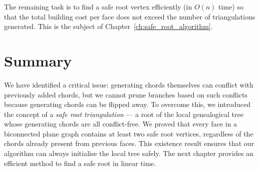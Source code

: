 The remaining task is to find a safe root vertex efficiently (in \(O(n)\) time) so that the total building cost per face does not exceed the number of triangulations generated. 
This is the subject of Chapter~\ref{ch:safe_root_algorithm}.

\section{Summary}
\label{sec:chapter8_summary}

We have identified a critical issue: generating chords themselves can conflict with previously added chords, but we cannot prune branches based on such conflicts because generating chords can be flipped away. 
To overcome this, we introduced the concept of a \emph{safe root triangulation} — a root of the local genealogical tree whose generating chords are all conflict-free. 
We proved that every face in a biconnected plane graph contains at least two safe root vertices, regardless of the chords already present from previous faces. 
This existence result ensures that our algorithm can always initialise the local tree safely. 
The next chapter provides an efficient method to find a safe root in linear time.